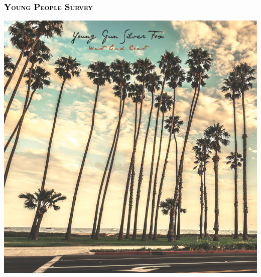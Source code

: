 \documentclass[russian, 10pt]{beamer}
\begin{document}
\begin{frame}
\frametitle{\textsc{\textcolor{black}{Young People Survey}}}

\includegraphics[scale=0.3]{images/outro.jpg}

\end{frame}
\end{document}
